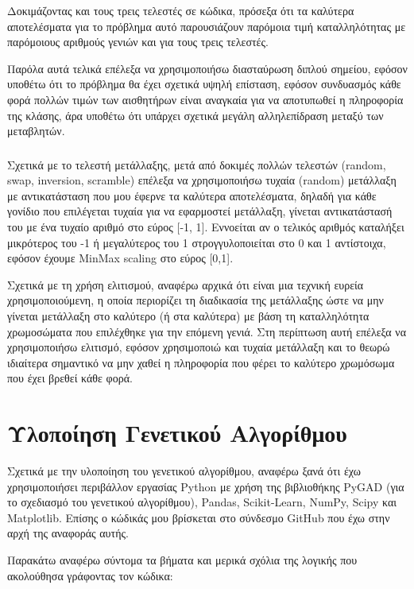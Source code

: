 \documentclass[12pt,a4paper]{article}
\begin{document}
Δοκιμάζοντας και τους τρεις τελεστές σε κώδικα, πρόσεξα ότι τα καλύτερα αποτελέσματα για το πρόβλημα αυτό παρουσιάζουν παρόμοια τιμή καταλληλότητας με παρόμοιους αριθμούς γενιών και για τους τρεις τελεστές.

Παρόλα αυτά τελικά επέλεξα να χρησιμοποιήσω διασταύρωση διπλού σημείου, εφόσον υποθέτω ότι το πρόβλημα θα έχει σχετικά υψηλή επίσταση, εφόσον συνδυασμός κάθε φορά πολλών τιμών των αισθητήρων είναι αναγκαία για να αποτυπωθεί η πληροφορία της κλάσης, άρα υποθέτω ότι υπάρχει σχετικά μεγάλη αλληλεπίδραση μεταξύ των μεταβλητών.

\subsubsection{}

Σχετικά με το τελεστή μετάλλαξης, μετά από δοκιμές πολλών τελεστών (random, swap, inversion, scramble) επέλεξα να χρησιμοποιήσω τυχαία (random) μετάλλαξη με αντικατάσταση που μου έφερνε τα καλύτερα αποτελέσματα, δηλαδή για κάθε γονίδιο που επιλέγεται τυχαία για να εφαρμοστεί μετάλλαξη, γίνεται αντικατάστασή του με ένα τυχαίο αριθμό στο εύρος [-1, 1]. Εννοείται αν ο τελικός αριθμός καταλήξει μικρότερος του -1 ή μεγαλύτερος του 1 στρογγυλοποιείται στο 0 και 1 αντίστοιχα, εφόσον έχουμε MinMax scaling στο εύρος [0,1].

Σχετικά με τη χρήση ελιτισμού, αναφέρω αρχικά ότι είναι μια τεχνική ευρεία χρησιμοποιούμενη, η οποία περιορίζει τη διαδικασία της μετάλλαξης ώστε να μην γίνεται μετάλλαξη στο καλύτερο (ή στα καλύτερα) με βάση τη καταλληλότητα χρωμοσώματα που επιλέχθηκε για την επόμενη γενιά. Στη περίπτωση αυτή επέλεξα να χρησιμοποιήσω ελιτισμό, εφόσον χρησιμοποιώ και τυχαία μετάλλαξη και το θεωρώ ιδιαίτερα σημαντικό να μην χαθεί η πληροφορία που φέρει το καλύτερο χρωμόσωμα που έχει βρεθεί κάθε φορά.

\section{Υλοποίηση Γενετικού Αλγορίθμου}

Σχετικά με την υλοποίηση του γενετικού αλγορίθμου, αναφέρω ξανά ότι έχω χρησιμοποιήσει περιβάλλον εργασίας Python με χρήση της βιβλιοθήκης PyGAD (για το σχεδιασμό του γενετικού αλγορίθμου), Pandas, Scikit-Learn, NumPy, Scipy και Matplotlib. Επίσης ο κώδικάς μου βρίσκεται στο σύνδεσμο GitHub που έχω στην αρχή της αναφοράς αυτής.

Παρακάτω αναφέρω σύντομα τα βήματα και μερικά σχόλια της λογικής που ακολούθησα γράφοντας τον κώδικα:
\end{document}
